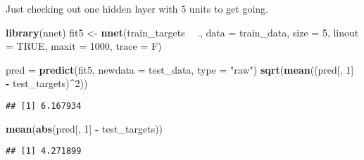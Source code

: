 \documentclass[10pt,ignorenonframetext,]{beamer}
\newenvironment{Shaded}{\begin{snugshade}}{\end{snugshade}}
\newcommand{\DataTypeTok}[1]{\textcolor[rgb]{0.13,0.29,0.53}{#1}}
\newcommand{\DecValTok}[1]{\textcolor[rgb]{0.00,0.00,0.81}{#1}}
\newcommand{\KeywordTok}[1]{\textcolor[rgb]{0.13,0.29,0.53}{\textbf{#1}}}
\newcommand{\NormalTok}[1]{#1}
\newcommand{\OperatorTok}[1]{\textcolor[rgb]{0.81,0.36,0.00}{\textbf{#1}}}
\newcommand{\OtherTok}[1]{\textcolor[rgb]{0.56,0.35,0.01}{#1}}
\newcommand{\StringTok}[1]{\textcolor[rgb]{0.31,0.60,0.02}{#1}}
\begin{document}
\begin{frame}[fragile]

Just checking out one hidden layer with 5 units to get going.

\scriptsize

\begin{Shaded}
\begin{Highlighting}[]
\KeywordTok{library}\NormalTok{(nnet)}
\NormalTok{fit5 <-}\StringTok{ }\KeywordTok{nnet}\NormalTok{(train_targets }\OperatorTok{~}\StringTok{ }\NormalTok{., }\DataTypeTok{data =}\NormalTok{ train_data, }\DataTypeTok{size =} \DecValTok{5}\NormalTok{, }\DataTypeTok{linout =} \OtherTok{TRUE}\NormalTok{, }
    \DataTypeTok{maxit =} \DecValTok{1000}\NormalTok{, }\DataTypeTok{trace =}\NormalTok{ F)}
\end{Highlighting}
\end{Shaded}

\begin{Shaded}
\begin{Highlighting}[]
\NormalTok{pred =}\StringTok{ }\KeywordTok{predict}\NormalTok{(fit5, }\DataTypeTok{newdata =}\NormalTok{ test_data, }\DataTypeTok{type =} \StringTok{"raw"}\NormalTok{)}
\KeywordTok{sqrt}\NormalTok{(}\KeywordTok{mean}\NormalTok{((pred[, }\DecValTok{1}\NormalTok{] }\OperatorTok{-}\StringTok{ }\NormalTok{test_targets)}\OperatorTok{^}\DecValTok{2}\NormalTok{))}
\end{Highlighting}
\end{Shaded}

\begin{verbatim}
## [1] 6.167934
\end{verbatim}

\begin{Shaded}
\begin{Highlighting}[]
\KeywordTok{mean}\NormalTok{(}\KeywordTok{abs}\NormalTok{(pred[, }\DecValTok{1}\NormalTok{] }\OperatorTok{-}\StringTok{ }\NormalTok{test_targets))}
\end{Highlighting}
\end{Shaded}

\begin{verbatim}
## [1] 4.271899
\end{verbatim}

\end{frame}
\end{document}
